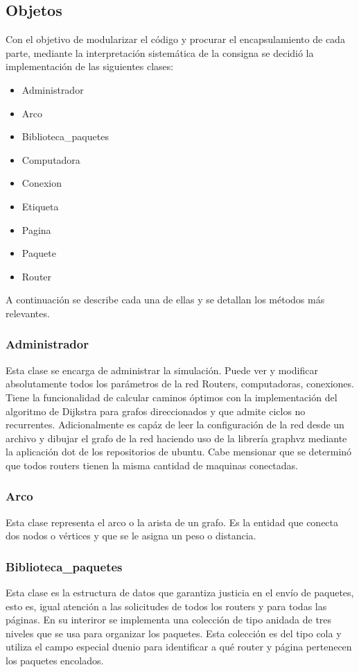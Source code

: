 \documentclass[12pt]{article} %
\begin{document}
\subsection{Objetos}
Con el objetivo de modularizar el código y procurar el encapsulamiento de cada parte, mediante la interpretación sistemática de la consigna se decidió la implementación de las siguientes clases:
\begin{itemize}
\item Administrador
\item Arco
\item Biblioteca\_paquetes
\item Computadora
\item Conexion
\item Etiqueta
\item Pagina
\item Paquete
\item Router
\end{itemize}
A continuación se describe cada una de ellas y se detallan los métodos más relevantes.
\subsubsection{Administrador}
Esta clase se encarga de administrar la simulación. Puede ver y modificar absolutamente todos los parámetros de la red Routers, computadoras, conexiones. Tiene la funcionalidad de calcular caminos óptimos con la implementación del algoritmo de Dijkstra para grafos direccionados y que admite ciclos no recurrentes. Adicionalmente es capáz de leer la configuración de la red desde un archivo y dibujar el grafo de la red haciendo uso de la librería graphvz mediante la aplicación dot de los repositorios de ubuntu.
Cabe mensionar que se determinó que todos routers tienen la misma cantidad de maquinas conectadas.
\subsubsection{Arco}
Esta clase representa el arco o la arista de un grafo. Es la entidad que conecta dos nodos o vértices y que se le asigna un peso o distancia.
\subsubsection{Biblioteca\_paquetes}
Esta clase es la estructura de datos que garantiza justicia en el envío de paquetes, esto es, igual atención a las solicitudes de todos los routers y para todas las páginas. En su interiror se implementa una colección de tipo anidada de tres niveles que se usa para organizar los paquetes. Esta colección es del tipo cola y utiliza el campo especial duenio para identificar a qué router y página pertenecen los paquetes encolados.
\end{document}
